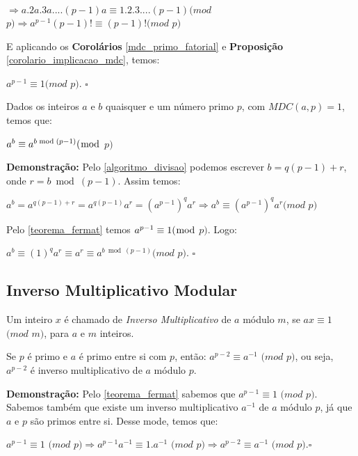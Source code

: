 $\Rightarrow a.2a.3a....(p-1)a \equiv 1.2.3....(p-1) (mod$ $p) \Rightarrow a^{p-1}(p-1)! \equiv (p-1)! (mod$ $p)$

E aplicando os \textbf{Corolários} \autoref{mdc_primo_fatorial} e \textbf{Proposição} \autoref{corolario_implicacao_mdc}, temos:

$a^{p-1}\equiv 1(mod$ $p)$. $\square$
\\


\begin{theorem}\label{teorema_fermat_expansao}
Dados os inteiros $a$ e $b$ quaisquer e um número primo $p$, com $MDC(a, p) = 1$, temos que:

$a^{b} \equiv a^{b \bmod (p-1)} (\bmod$ $p)$
\end{theorem}
\textbf{Demonstração:}
Pelo \autoref{algoritmo_divisao} podemos escrever $b=q(p-1)+r$, onde $r=b\bmod(p-1)$. Assim temos:

$a^b = a^{q(p-1)+r} = a^{q(p-1)}a^r = (a^{p-1})^qa^r \Rightarrow a^b \equiv (a^{p-1})^qa^r (mod$ $p)$ 

Pelo \autoref{teorema_fermat} temos $a^{p-1} \equiv 1 (\bmod$ $p)$. Logo:

$a^b \equiv (1)^qa^r \equiv a^r \equiv a^{b \bmod (p-1)} (mod$ $p)$. $\square$
\\

\subsection{Inverso Multiplicativo Modular}

\begin{definition}
Um inteiro $x$ é chamado de \textit{Inverso Multiplicativo} de $a$ módulo $m$, se $ax\equiv1$ $(mod$ $m)$, para $a$ e $m$ inteiros.
\end{definition}


\begin{theorem}\label{inveso_multiplicativo_modular}
Se $p$ é primo e $a$ é primo entre si com $p$, então: $a^{p-2} \equiv a^{-1}$ $(mod$ $p)$, ou seja, $a^{p-2}$ é inverso multiplicativo
de $a$ módulo $p$.
\end{theorem}
\textbf{Demonstração:}
Pelo \autoref{teorema_fermat} sabemos que $a^{p-1}\equiv1$ $(mod$ $p)$. Sabemos também que existe um inverso multiplicativo $a^{-1}$
de $a$ módulo $p$, já que $a$ e $p$ são primos entre si. Desse mode, temos que:

$a^{p-1}\equiv1$ $(mod$ $p) \Rightarrow a^{p-1}a^{-1} \equiv 1.a^{-1}$ $(mod$ $p) \Rightarrow a^{p-2}\equiv a^{-1}$ $(mod$ $p)$.$\square$


